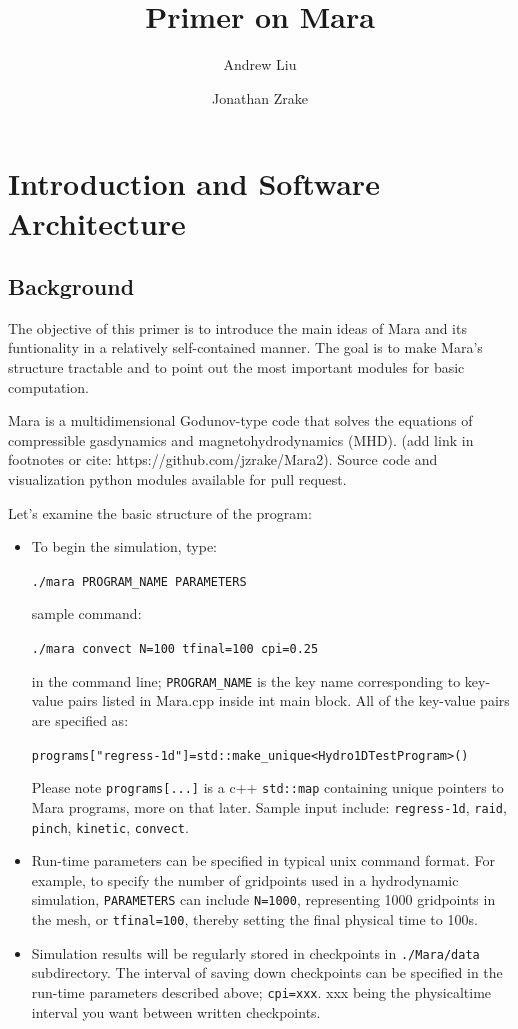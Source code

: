 \documentclass{article}
\title{Primer on Mara}
\author{Andrew Liu \and Jonathan Zrake}
\begin{document}
\maketitle

\section{Introduction and Software Architecture}
\subsection{Background}
The objective of this primer is to introduce the main ideas of Mara and its funtionality in a relatively self-contained manner. The goal is to make Mara's structure tractable and to point out the most important modules for basic computation.

Mara is a multidimensional Godunov-type code that solves the equations of
compressible gasdynamics and magnetohydrodynamics (MHD). (add link in footnotes or cite: https://github.com/jzrake/Mara2). Source code and visualization python modules available for pull request.

Let's examine the basic structure of the program:
\begin{itemize}
	\item To begin the simulation, type: 

	\texttt{./mara PROGRAM\_NAME PARAMETERS}

	sample command:

\texttt{./mara convect N=100 tfinal=100 cpi=0.25}
	
in the command line; \texttt{PROGRAM\_NAME} is the key name corresponding to key-value pairs listed in Mara.cpp inside int main block. All of the key-value pairs are specified as: 

\texttt{programs["regress-1d"]=std::make\_unique<Hydro1DTestProgram>()}

Please note \texttt{programs[...]} is a c++ \texttt{std::map} containing unique pointers to Mara programs, more on that later. Sample input include: \texttt{regress-1d}, \texttt{raid}, \texttt{pinch}, \texttt{kinetic}, \texttt{convect}.

	\item Run-time parameters can be specified in typical unix command format. For example, to specify the number of gridpoints used in a hydrodynamic simulation, \texttt{PARAMETERS} can include \texttt{N=1000}, representing 1000 gridpoints in the mesh, or \texttt{tfinal=100}, thereby setting the final physical time to 100s.  
	
	\item Simulation results will be regularly stored in checkpoints in \texttt{./Mara/data} subdirectory. The interval of saving down checkpoints can be specified in the run-time parameters described above; \texttt{cpi=xxx}. xxx being the physicaltime interval you want between written checkpoints.
	

\end{itemize}
\end{document}
